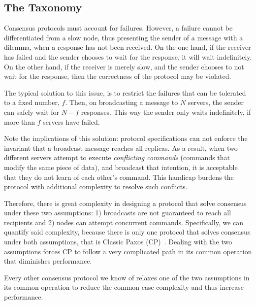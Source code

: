 \subsection{The Taxonomy}


Consensus protocols must account for failures. %
However, a failure cannot be differentiated from a slow node, thus presenting the  sender of a message with a dilemma, when a response has not been received. On the one hand, if the receiver has failed and the sender chooses to wait for the response, it will wait indefinitely. On the other hand, if the receiver is merely slow, and the sender chooses to not wait for the response, then the correctness of the protocol may be violated. 

The typical solution to this issue, is to restrict the failures that can be tolerated to a fixed number, $f$. Then, on broadcasting a message to $N$ servers, the sender can safely wait for $N-f$ responses. This way the sender only waits indefinitely, if more than $f$ servers have failed.%

Note the implications of this solution: protocol specifications can not enforce the invariant that a broadcast message reaches all replicas. As a result, when two different servers attempt to execute \emph{conflicting commands} (\ie commands that modify the same piece of data), and broadcast that intention, it is acceptable that they do not learn of each other's command. This handicap burdens the protocol with additional complexity to resolve such conflicts.

Therefore, there is great complexity in designing a protocol that solve consensus under these two assumptions: 1) broadcasts are not guaranteed to reach all recipients and 2) nodes can attempt concurrent commands. Specifically, we can quantify said complexity, because there is only one protocol that solves consensus under both assumptions, that is Classic Paxos (CP)~\cite{Lamport:1998}. Dealing with the two assumptions forces CP to follow a very complicated path in its common operation that diminishes performance.

Every other consensus protocol we know of relaxes one of the two assumptions in its common operation to reduce the common case complexity and thus increase performance.

